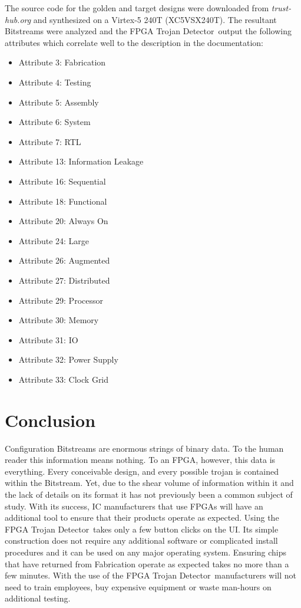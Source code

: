 \documentclass[conference]{IEEEtran}
\newcommand{\Name}{\acrshort{FPGA} Trojan Detector}
\newcommand{\NameNoPeriod}{\Name~}
\begin{document}
The source code for the \gls{golden} and \gls{target} designs were downloaded from \textit{trust-hub.org} and synthesized on a Virtex-5 240T  (XC5VSX240T).
The resultant \gls{Bitstream}s were analyzed and the \NameNoPeriod output the following attributes which correlate well to the description in the documentation:
\begin{itemize}
	\item Attribute 3: Fabrication
	\item Attribute 4: Testing
	\item Attribute 5: Assembly
	\item Attribute 6: System
	\item Attribute 7: RTL
	\item Attribute 13: Information Leakage
	\item Attribute 16: Sequential
	\item Attribute 18: Functional
	\item Attribute 20: Always On
	\item Attribute 24: Large
	\item Attribute 26: Augmented
	\item Attribute 27: Distributed
	\item Attribute 29: Processor
	\item Attribute 30: Memory
	\item Attribute 31: \acrshort{IO}
	\item Attribute 32: Power Supply
	\item Attribute 33: Clock Grid
\end{itemize}
\section{Conclusion}
Configuration \gls{Bitstream}s are enormous strings of binary data.
To the human reader this information means nothing.
To an \acrshort{FPGA}, however, this data is everything.
Every conceivable design, and every possible trojan is contained within the \gls{Bitstream}.
Yet, due to the shear volume of information within it and the lack of details on its format it has not previously been a common subject of study.
With its success, \acrlong{IC} manufacturers that use \acrshort{FPGA}s will have an additional tool to ensure that their products operate as expected.
Using the \NameNoPeriod takes only a few button clicks on the \acrlong{UI}.
Its simple construction does not require any additional software or complicated install procedures and it can be used on any major operating system.
Ensuring chips that have returned from Fabrication operate as expected takes no more than a few minutes.
With the use of the \NameNoPeriod manufacturers will not need to train employees, buy expensive equipment or waste man-hours on additional testing.






%
%

\printbibliography
\end{document}
